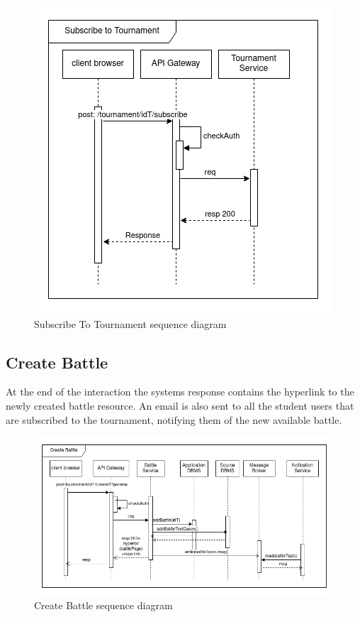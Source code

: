 \begin{figure}[H]
    \centering
    \includegraphics[width=1\linewidth]{misc//Images//UC/UC4.png}
    \caption{Subscribe To Tournament sequence diagram}
    \label{fig:enter-label}
\end{figure}
\newpage
\subsection{Create Battle}

At the end of the interaction the systems response contains the hyperlink to the newly created battle resource. An email is also sent to all the student users that are subscribed to the tournament, notifying them of the new available battle.

\begin{figure}[H]
    \centering
    \includegraphics[width=1\linewidth]{misc//Images//UC/UC5.png}
    \caption{Create Battle sequence diagram}
    \label{fig:enter-label}
\end{figure}
\newpage
